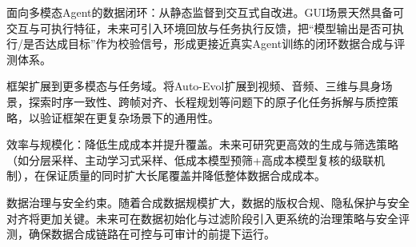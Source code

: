 面向多模态Agent的数据闭环：从静态监督到交互式自改进。GUI场景天然具备可交互与可执行特征，未来可引入环境回放与任务执行反馈，把“模型输出是否可执行/是否达成目标”作为校验信号，形成更接近真实Agent训练的闭环数据合成与评测体系。

框架扩展到更多模态与任务域。将Auto-Evol扩展到视频、音频、三维与具身场景，探索时序一致性、跨帧对齐、长程规划等问题下的原子化任务拆解与质控策略，以验证框架在更复杂场景下的通用性。

效率与规模化：降低生成成本并提升覆盖。未来可研究更高效的生成与筛选策略（如分层采样、主动学习式采样、低成本模型预筛+高成本模型复核的级联机制），在保证质量的同时扩大长尾覆盖并降低整体数据合成成本。

数据治理与安全约束。随着合成数据规模扩大，数据的版权合规、隐私保护与安全对齐将更加关键。未来可在数据初始化与过滤阶段引入更系统的治理策略与安全评测，确保数据合成链路在可控与可审计的前提下运行。

